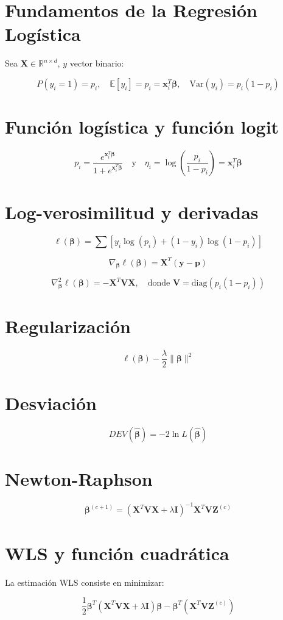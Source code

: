 \documentclass[12pt]{article}
\begin{document}
\section{Fundamentos de la Regresión Logística}

Sea $\bm{X} \in \mathbb{R}^{n \times d}$, $y$ vector binario:

\[
P(y_i = 1) = p_i, \quad \mathbb{E}[y_i] = p_i = \bm{x}_i^T \bm{\beta}, \quad \mathrm{Var}(y_i) = p_i(1 - p_i)
\]

\section{Función logística y función logit}

\[
p_i = \frac{e^{\bm{x}_i^T \bm{\beta}}}{1 + e^{\bm{x}_i^T \bm{\beta}}}
\quad
\text{y}
\quad
\eta_i = \log\left( \frac{p_i}{1 - p_i} \right) = \bm{x}_i^T \bm{\beta}
\]

\section{Log-verosimilitud y derivadas}

\[
\ell(\bm{\beta}) = \sum \left[ y_i \log(p_i) + (1 - y_i)\log(1 - p_i) \right]
\]

\[
\nabla_{\bm{\beta}} \ell(\bm{\beta}) = \bm{X}^T(\bm{y} - \bm{p})
\]

\[
\nabla^2_{\bm{\beta}} \ell(\bm{\beta}) = - \bm{X}^T \bm{V} \bm{X}, \quad \text{donde } \bm{V} = \text{diag}(p_i(1 - p_i))
\]

\section{Regularización}

\[
\ell(\bm{\beta}) - \frac{\lambda}{2} \|\bm{\beta}\|^2
\]

\section{Desviación}

\[
DEV(\hat{\bm{\beta}}) = -2 \ln L(\hat{\bm{\beta}})
\]

\section{Newton-Raphson}

\[
\bm{\beta}^{(c+1)} = \left( \bm{X}^T \bm{V} \bm{X} + \lambda \bm{I} \right)^{-1} \bm{X}^T \bm{V} \bm{Z}^{(c)}
\]

\section{WLS y función cuadrática}

La estimación WLS consiste en minimizar:

\[
\frac{1}{2} \bm{\beta}^T \left( \bm{X}^T \bm{V} \bm{X} + \lambda \bm{I} \right) \bm{\beta} - \bm{\beta}^T (\bm{X}^T \bm{V} \bm{Z}^{(c)})
\]
\end{document}
